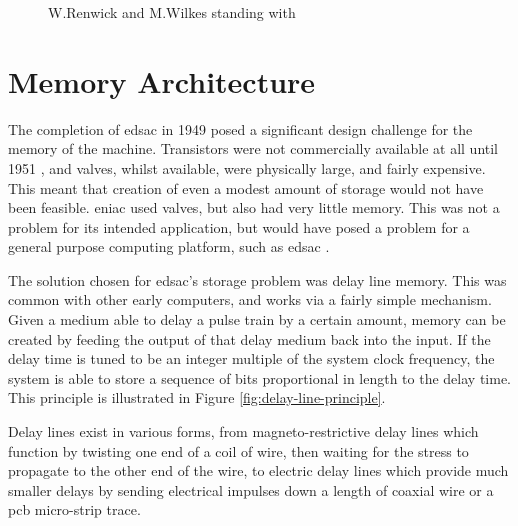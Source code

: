 \begin{figure}[ht]
	\centering
	\caption{W.Renwick and M.Wilkes standing with  \cite{cam2011b}}
	\label{fig:edsac-photo}
\end{figure}

\section{ Memory Architecture} \label{sec:edsac-mem-arch}
The completion of \gls{edsac} in 1949 posed a significant design challenge for the memory of the machine. Transistors were not commercially available at all until 1951 \cite{bonne2007}, and valves, whilst available, were physically large, and fairly expensive. This meant that creation of even a modest amount of storage would not have been feasible. \Gls{eniac} used valves, but also had very little memory. This was not a problem for its intended application, but would have posed a problem for a general purpose computing platform, such as \gls{edsac} \cite[p.208]{wilkes1948}.

The solution chosen for \gls{edsac}'s storage problem was delay line memory. This was common with other early computers, and works via a fairly simple mechanism. Given a medium able to delay a pulse train by a certain amount, memory can be created by feeding the output of that delay medium back into the input. If the delay time is tuned to be an integer multiple of the system clock frequency, the system is able to store a sequence of bits proportional in length to the delay time. This principle is illustrated in Figure \ref{fig:delay-line-principle}.

Delay lines exist in various forms, from magneto-restrictive delay lines which function by twisting one end of a coil of wire, then waiting for the stress to propagate to the other end of the wire, to electric delay lines which provide much smaller delays by sending electrical impulses down a length of coaxial wire or a \gls{pcb} micro-strip trace.

